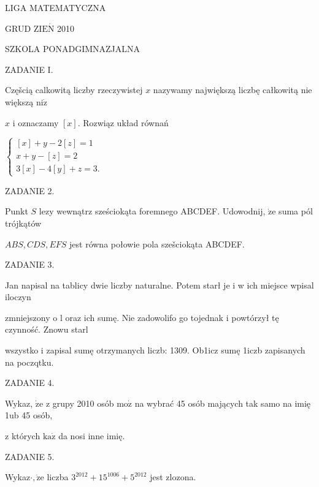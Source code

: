 \documentclass[a4paper,12pt]{article}
\begin{document}
LIGA MATEMATYCZNA

GRUD Z$\mathrm{I}\mathrm{E}\acute{\mathrm{N}}$ 2010

SZKOLA PONADGIMNAZJALNA

ZADANIE I.

Częšcią calkowitą liczby rzeczywistej $x$ nazywamy największą liczbę całkowitą nie większą $\mathrm{n}\mathrm{i}\dot{\mathrm{z}}$

$x$ i oznaczamy $[x]$. Rozwiąz układ równań

$\left\{\begin{array}{l}
[x]+y-2[z]=1\\
x+y-[z]=2\\
3[x]-4[y]+z=3.
\end{array}\right.$

ZADANIE 2.

Punkt $S$ lezy wewnątrz sześciokąta foremnego ABCDEF. Udowodnij, $\dot{\mathrm{z}}\mathrm{e}$ suma pól trójkątów

$ABS, CDS, EFS$ jest równa połowie pola szešciokąta ABCDEF.

ZADANIE 3.

Jan napisal na tablicy dwie liczby naturalne. Potem starł je i w ich miejsce wpisal iloczyn

zmniejszony o l oraz ich sumę. Nie zadowolifo go tojednak i powtórzył tę czynność. Znowu starl

wszystko i zapisal sumę otrzymanych liczb: 1309. Ob1icz sumę 1iczb zapisanych na poczqtku.

ZADANIE 4.

Wykaz, $\dot{\mathrm{z}}\mathrm{e}$ z grupy 2010 osób $\mathrm{m}\mathrm{o}\dot{\mathrm{z}}$ na wybrać 45 osób mających tak samo na imię 1ub 45 osób,

z których $\mathrm{k}\mathrm{a}\dot{\mathrm{z}}$ da nosi inne imię.

ZADANIE 5.

Wykaz$\cdot, \dot{\mathrm{z}}\mathrm{e}$ liczba $3^{2012}+15^{1006}+5^{2012}$ jest zlozona.
\end{document}
